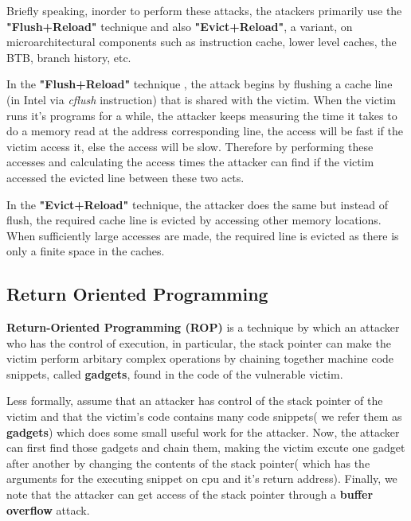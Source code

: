 \documentclass[12pt]{article}
\begin{document}
\begin{appendices}
	Briefly speaking, inorder to perform these attacks, the atackers primarily use the \textbf{"Flush+Reload"}
	technique and also \textbf{"Evict+Reload"}, a variant, on microarchitectural components such as instruction cache, lower level caches, the BTB, branch history, etc. 
	
	In the \textbf{"Flush+Reload"} technique , the attack begins by flushing a cache line (in Intel via \textit{cflush} instruction) that is shared with the victim. When the victim runs it's programs for a while, the attacker keeps measuring the time it takes to do a memory read at the address corresponding line, the access will be fast if the victim access it, else the access will be slow. Therefore by performing these accesses and calculating the access times the attacker can find if the victim accessed the evicted line between these two acts.
	
	In the \textbf{"Evict+Reload"} technique, the attacker does the same but instead of flush, the required cache line is evicted by accessing other memory locations. When sufficiently large accesses are made, the required line is evicted as there is only a finite space in the caches.
	
	\subsection{Return Oriented Programming}
	\textbf{Return-Oriented Programming (ROP)} is a technique by which an attacker who has the control of execution, in particular, the stack pointer can make the victim perform arbitary complex operations by chaining together machine code snippets, called \textbf{gadgets}, found in the code of the vulnerable victim.
	
	Less formally, assume that an attacker has control of the stack pointer of the victim and that the  victim's code contains many code snippets( we refer them as \textbf{gadgets}) which does some small useful work for the attacker. Now, the attacker can first find those gadgets and chain them, making the victim excute one gadget after another by changing the contents of the stack pointer( which has the arguments for the executing snippet on cpu and it's return address). Finally, we note that the attacker can get access of the stack pointer through a  \textbf{buffer overflow} attack.
	

\end{appendices}
\end{document}
